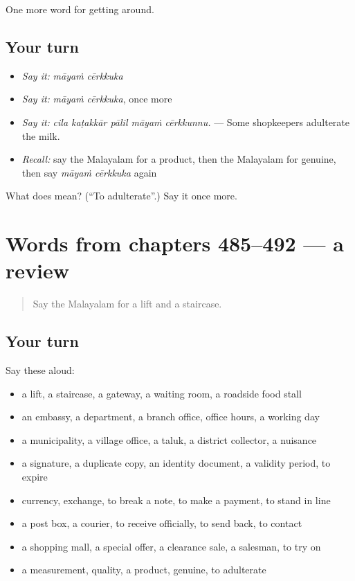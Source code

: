 \begin{grammarlens}[title={What you've built}]
One more word for getting around.
\end{grammarlens}

\subsection*{Your turn}
\begin{itemize}
\raggedright
  \item \emph{Say it:} \emph{māyaṁ cērkkuka}
  \item \emph{Say it:} \emph{māyaṁ cērkkuka}, once more
  \item \emph{Say it:} \emph{cila kaṭakkār pālil māyaṁ cērkkunnu.} — Some shopkeepers adulterate the milk.
  \item \emph{Recall:} say the Malayalam for a product, then the Malayalam for genuine, then say \emph{māyaṁ cērkkuka} again
\end{itemize}

\begin{tcolorbox}[breakable,colback=teal!4,colframe=teal!35!black,title={Before you move on}]
What does   mean? (\textquotedblleft{}To adulterate\textquotedblright{}.) Say it once more.
\end{tcolorbox}
\section[(dialogue)]{Words from chapters 485–492 — a review}

\label{lesson:ML-R492-review-485-492}



\begin{quote}
Say the Malayalam for a lift and a staircase.
\end{quote}

\subsection*{Your turn}
Say these aloud:

\begin{itemize}
\raggedright
  \item a lift, a staircase, a gateway, a waiting room, a roadside food stall
  \item an embassy, a department, a branch office, office hours, a working day
  \item a municipality, a village office, a taluk, a district collector, a nuisance
  \item a signature, a duplicate copy, an identity document, a validity period, to expire
  \item currency, exchange, to break a note, to make a payment, to stand in line
  \item a post box, a courier, to receive officially, to send back, to contact
  \item a shopping mall, a special offer, a clearance sale, a salesman, to try on
  \item a measurement, quality, a product, genuine, to adulterate
\end{itemize}

